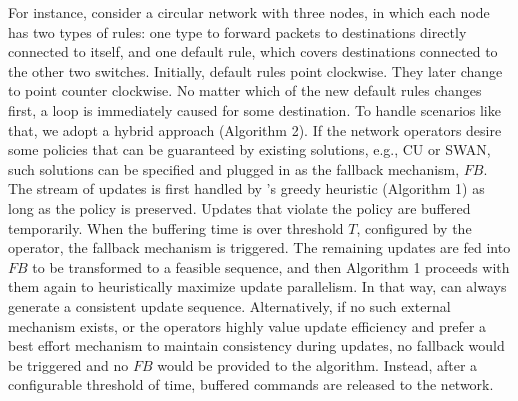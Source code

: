 For instance, consider a circular network with three nodes, in which each node
has two types of rules: one type to forward packets to destinations directly connected to itself, and one default rule, which covers destinations connected to the other two switches. 
Initially, default rules point clockwise. They later change to
point counter clockwise. No matter which of the new default
rules changes first, a loop is immediately caused for some destination. 
To handle scenarios like that, 
we adopt a hybrid approach (Algorithm 2).  If the network
operators desire some policies that can be guaranteed by existing
solutions, e.g., CU or SWAN, such solutions can be specified and plugged in as
the fallback mechanism, $FB$.
The stream of updates is first handled by \name's greedy heuristic (Algorithm 1)
as long as the
policy is preserved. Updates that violate the policy are buffered temporarily.
When the buffering time is over threshold $T$, configured by the operator,
the fallback mechanism is triggered.
The remaining updates are fed into $FB$ to be transformed to a feasible sequence, and then Algorithm 1 proceeds with them again to heuristically maximize update parallelism. 
In that way, \name can always generate a consistent update sequence.
Alternatively, if no such external mechanism exists, 
 or the operators highly
value update efficiency and prefer a best effort mechanism to maintain consistency
during updates, no fallback would be triggered and no
$FB$ would be provided to the algorithm.  Instead, after a
configurable threshold of time, buffered commands are released to the network.

